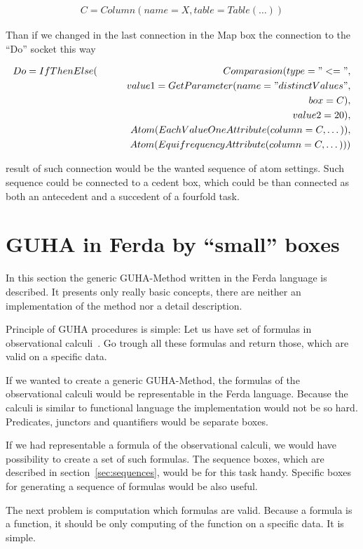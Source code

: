 \documentclass[a4paper,12pt]{book}
\begin{document}
\begin{eqnarray*}
C=Column(name=X, table=Table(\dots))
\end{eqnarray*}

Than if we changed in the last connection in the Map box the connection to the ``Do'' socket this way

\begin{eqnarray*}
Do=IfThenElse(&&Comparasion(type="<=", \\&&\qquad value1=GetParameter(name="distinctValues", \\&&\qquad\qquad box=C), \\&&\qquad value2=20),\\&&Atom(EachValueOneAttribute(column=C,\dots)),\\&&Atom(EquifrequencyAttribute(column=C,\dots)))
\end{eqnarray*}

result of such connection would be the wanted sequence of atom settings. Such sequence could be connected to a cedent box, which could be than connected as both an antecedent and a succedent of a fourfold task.

\section{GUHA in Ferda by ``small'' boxes}
In this section the generic GUHA-Method written in the Ferda language is described. It presents only really basic concepts, there are neither an implementation of the method nor a detail description.

Principle of GUHA procedures is simple: Let us have set of formulas in observational calculi~\cite{GUHAbook}. Go trough all these formulas and return those, which are valid on a specific data.

If we wanted to create a generic GUHA-Method, the formulas of the observational calculi would be representable in the Ferda language. Because the calculi is similar to functional language the implementation would not be so hard. Predicates, junctors and quantifiers would be separate boxes.

If we had representable a formula of the observational calculi, we would have possibility to create a set of such formulas. The sequence boxes, which are described in section~\ref{sec:sequences}, would be for this task handy. Specific boxes for generating a sequence of formulas would be also useful.

The next problem is computation which formulas are valid. Because a formula is a function, it should be only computing of the function on a specific data. It is simple.
\end{document}
